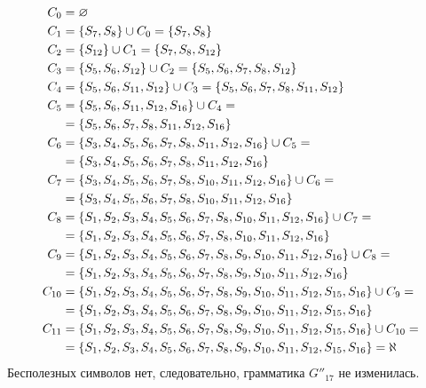 \begin{itemize}
\begin{align*}
		      C_{0}  & = \varnothing                                                                                             \\
		      C_{1}  & = \left\{S_{7}, S_{8}\right\} \cup C_{0} = \left\{S_{7}, S_{8}\right\}                                                      \\
		      C_{2}  & = \left\{S_{12}\right\} \cup C_{1} = \left\{S_7, S_8, S_{12}\right\}                                                        \\
		      C_{3}  & = \left\{S_5, S_6, S_{12}\right\} \cup C_{2} = \left\{S_5, S_6, S_7, S_8, S_{12}\right\}                                    \\
		      C_{4}  & = \left\{S_5, S_6, S_{11}, S_{12}\right\} \cup C_{3} = \left\{S_5, S_6, S_7, S_8, S_{11}, S_{12}\right\}                    \\
		      C_{5}  & = \left\{S_5, S_6, S_{11}, S_{12}, S_{16}\right\} \cup C_{4} =                                                     \\
		             & = \left\{S_5, S_6, S_7, S_8, S_{11}, S_{12}, S_{16}\right\}                                                        \\
		      C_{6}  & = \left\{S_3, S_4, S_5, S_6, S_7, S_8, S_{11}, S_{12}, S_{16}\right\} \cup C_{5} =                                 \\
		             & = \left\{S_3, S_4, S_5, S_6, S_7, S_8, S_{11}, S_{12}, S_{16}\right\}                                              \\
		      C_{7}  & = \left\{S_3, S_4, S_5, S_6, S_7, S_8, S_{10}, S_{11}, S_{12}, S_{16}\right\} \cup C_{6} =                         \\
		             & = \left\{S_3, S_4, S_5, S_6, S_7, S_8, S_{10}, S_{11}, S_{12}, S_{16}\right\}                                      \\
		      C_{8}  & = \left\{S_1, S_2, S_3, S_4, S_5, S_6, S_7, S_8, S_{10}, S_{11}, S_{12}, S_{16}\right\} \cup C_{7} =               \\
		             & = \left\{S_1, S_2, S_3, S_4, S_5, S_6, S_7, S_8, S_{10}, S_{11}, S_{12}, S_{16}\right\}                            \\
		      C_{9}  & = \left\{S_1, S_2, S_3, S_4, S_5, S_6, S_7, S_8, S_9, S_{10}, S_{11}, S_{12}, S_{16}\right\} \cup C_{8} =          \\
		             & = \left\{S_1, S_2, S_3, S_4, S_5, S_6, S_7, S_8, S_9, S_{10}, S_{11}, S_{12}, S_{16}\right\}                       \\
		      C_{10} & = \left\{S_1, S_2, S_3, S_4, S_5, S_6, S_7, S_8, S_9, S_{10}, S_{11}, S_{12}, S_{15}, S_{16}\right\} \cup C_{9} =  \\
		             & = \left\{S_1, S_2, S_3, S_4, S_5, S_6, S_7, S_8, S_9, S_{10}, S_{11}, S_{12}, S_{15}, S_{16}\right\}               \\
		      C_{11} & = \left\{S_1, S_2, S_3, S_4, S_5, S_6, S_7, S_8, S_9, S_{10}, S_{11}, S_{12}, S_{15}, S_{16}\right\} \cup C_{10} = \\
		             & = \left\{S_1, S_2, S_3, S_4, S_5, S_6, S_7, S_8, S_9, S_{10}, S_{11}, S_{12}, S_{15}, S_{16}\right\} = \aleph
	      \end{align*}
	      Бесполезных символов нет, следовательно, грамматика \(G''_{17}\) не изменилась.
\end{itemize}
